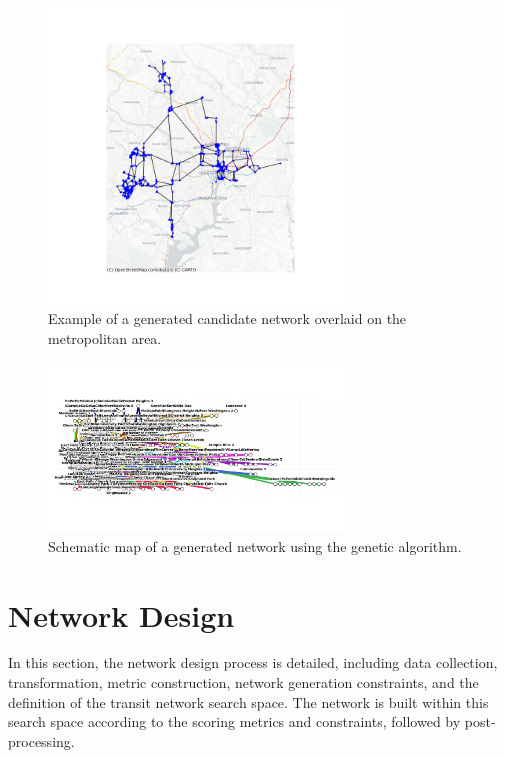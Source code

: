 \documentclass[manuscript,nonacm]{acmart}
\begin{document}
\begin{figure}[h]
    \centering
    \includegraphics[width=0.7\textwidth]{img/network_map.png}
    \caption{Example of a generated candidate network overlaid on the metropolitan area.}
    \label{fig:networkmap}
\end{figure}


\begin{figure}[h]
    \centering
    \includegraphics[width=0.7\textwidth]{img/lines_genetic.png}
    \caption{Schematic map of a generated network using the genetic algorithm.}
    \label{fig:schematic}
\end{figure}

\section{Network Design}

In this section, the network design process is detailed, including data collection, transformation, metric construction, network generation constraints, and the definition of the transit network search space. The network is built within this search space according to the scoring metrics and constraints, followed by post-processing.
\end{document}
